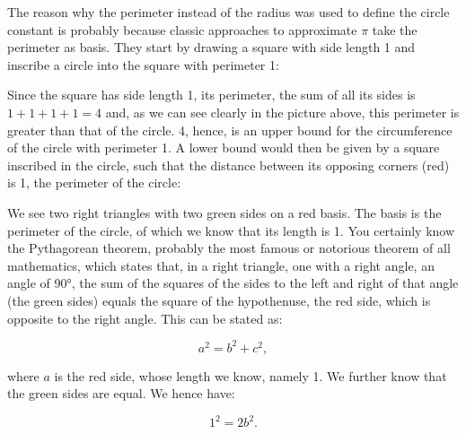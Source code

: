 \documentclass[tikz]{scrreprt}
\begin{document}
The reason why the perimeter 
instead of the radius was used
to define the circle constant is probably
because classic approaches to approximate $\pi$
take the perimeter as basis.
They start by drawing a square with side length 1
and inscribe a circle into the square with 
perimeter 1:

\begin{center}
\end{center}

Since the square has side length 1,
its perimeter, the sum of all its sides is
$1+1+1+1 = 4$ and, as we can see clearly
in the picture above, this perimeter
is greater than that of the circle.
4, hence, is an upper bound for the circumference
of the circle with perimeter 1.
A lower bound would then be given
by a square inscribed in the circle,
such that the distance between 
its opposing corners (red) is 1, the perimeter
of the circle:

\begin{center}
\end{center}

We see two right triangles with two green sides 
on a red basis. The basis is the perimeter
of the circle, of which we know that its length is 1.
You certainly know the Pythagorean theorem,
probably the most famous or notorious theorem of all mathematics,
which states that, in a right triangle,
one with a right angle, an angle of 90°, the sum of the squares
of the sides to the left and right of that angle (the green sides)
equals the square of the hypothenuse, the red side,
which is opposite to the right angle.
This can be stated as:

\begin{equation}
a^2 = b^2 + c^2,
\end{equation}

where $a$ is the red side, whose length we know,
namely 1. We further know that the green sides
are equal. We hence have:

\begin{equation}
1^2 = 2b^2.
\end{equation}
\end{document}
